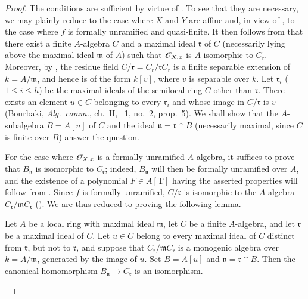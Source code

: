 \begin{proof}
The conditions are sufficient by virtue of .
To see that they are necessary, we may plainly reduce to the case where $X$ and $Y$ are affine and, in view of , to the case where $f$ is formally unramified and quasi-finite.
It then follows from  that there exist a finite $A$-algebra $C$ and a maximal ideal $\mathfrak{r}$ of $C$ (necessarily lying above the maximal ideal $\mathfrak{m}$ of $A$) such that $\mathscr{O}_{X,x}$ is $A$-isomorphic to $C_\mathfrak{r}$.
Moreover, by , the residue field $C/\mathfrak{r}=C_\mathfrak{r}/\mathfrak{r}C_\mathfrak{r}$ is a finite separable extension of $k=A/\mathfrak{m}$, and hence is of the form $k[v]$, where $v$ is separable over $k$.
Let $\mathfrak{r}_i$ ($1\leq i\leq h$) be the maximal ideals of the semilocal ring $C$ other than $\mathfrak{r}$.
There exists an element $u\in C$ belonging to every $\mathfrak{r}_i$ and whose image in $C/\mathfrak{r}$ is $v$ (Bourbaki, \emph{Alg.\ comm.}, ch.~II, \textsection~1, no.~2, prop.~5).
We shall show that the $A$-subalgebra $B=A[u]$ of $C$ and the ideal $\mathfrak{n}=\mathfrak{r}\cap B$ (necessarily maximal, since $C$ is finite over $B$) answer the question.

For the case where $\mathscr{O}_{X,x}$ is a formally unramified $A$-algebra, it suffices to prove that $B_\mathfrak{n}$ is isomorphic to $C_\mathfrak{r}$; indeed, $B_\mathfrak{n}$ will then be formally unramified over $A$, and the existence of a polynomial $F\in A[\mathrm{T}]$ having the asserted properties will follow from .
Since $f$ is formally unramified, $C/\mathfrak{r}$ is isomorphic to the $A$-algebra $C_\mathfrak{r}/\mathfrak{m}C_\mathfrak{r}$ ().
We are thus reduced to proving the following lemma.

\begin{lemma}[18.4.6.1]
\label{IV.18.4.6.1}
Let $A$ be a local ring with maximal ideal $\mathfrak{m}$, let $C$ be a finite $A$-algebra, and let $\mathfrak{r}$ be a maximal ideal of $C$.
Let $u\in C$ belong to every maximal ideal of $C$ distinct from $\mathfrak{r}$, but not to $\mathfrak{r}$, and suppose that $C_\mathfrak{r}/\mathfrak{m}C_\mathfrak{r}$ is a monogenic algebra over $k=A/\mathfrak{m}$, generated by the image of $u$.
Set $B=A[u]$ and $\mathfrak{n}=\mathfrak{r}\cap B$.
Then the canonical homomorphism $B_\mathfrak{n}\to C_\mathfrak{r}$ is an isomorphism.
\end{lemma}


\end{proof}
